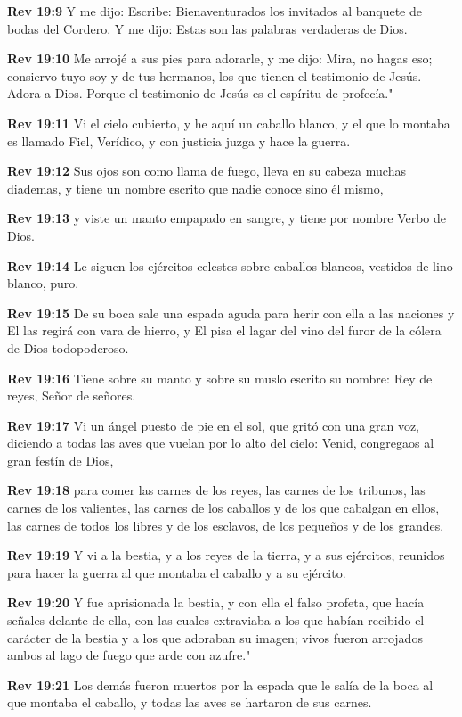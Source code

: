 \textbf{Rev 19:9} Y me dijo: Escribe: Bienaventurados los invitados al banquete de bodas del Cordero. Y me dijo: Estas son las palabras verdaderas de Dios. 

\textbf{Rev 19:10} Me arrojé a sus pies para adorarle, y me dijo: Mira, no hagas eso; consiervo tuyo soy y de tus hermanos, los que tienen el testimonio de Jesús. Adora a Dios. Porque el testimonio de Jesús es el espíritu de profecía." 

\textbf{Rev 19:11} Vi el cielo cubierto, y he aquí un caballo blanco, y el que lo montaba es llamado Fiel, Verídico, y con justicia juzga y hace la guerra. 

\textbf{Rev 19:12} Sus ojos son como llama de fuego, lleva en su cabeza muchas diademas, y tiene un nombre escrito que nadie conoce sino él mismo, 

\textbf{Rev 19:13} y viste un manto empapado en sangre, y tiene por nombre Verbo de Dios. 

\textbf{Rev 19:14} Le siguen los ejércitos celestes sobre caballos blancos, vestidos de lino blanco, puro. 

\textbf{Rev 19:15} De su boca sale una espada aguda para herir con ella a las naciones y El las regirá con vara de hierro, y El pisa el lagar del vino del furor de la cólera de Dios todopoderoso. 

\textbf{Rev 19:16} Tiene sobre su manto y sobre su muslo escrito su nombre: Rey de reyes, Señor de señores. 

\textbf{Rev 19:17} Vi un ángel puesto de pie en el sol, que gritó con una gran voz, diciendo a todas las aves que vuelan por lo alto del cielo: Venid, congregaos al gran festín de Dios, 

\textbf{Rev 19:18} para comer las carnes de los reyes, las carnes de los tribunos, las carnes de los valientes, las carnes de los caballos y de los que cabalgan en ellos, las carnes de todos los libres y de los esclavos, de los pequeños y de los grandes. 

\textbf{Rev 19:19} Y vi a la bestia, y a los reyes de la tierra, y a sus ejércitos, reunidos para hacer la guerra al que montaba el caballo y a su ejército. 

\textbf{Rev 19:20} Y fue aprisionada la bestia, y con ella el falso profeta, que hacía señales delante de ella, con las cuales extraviaba a los que habían recibido el carácter de la bestia y a los que adoraban su imagen; vivos fueron arrojados ambos al lago de fuego que arde con azufre." 

\textbf{Rev 19:21} Los demás fueron muertos por la espada que le salía de la boca al que montaba el caballo, y todas las aves se hartaron de sus carnes. 

